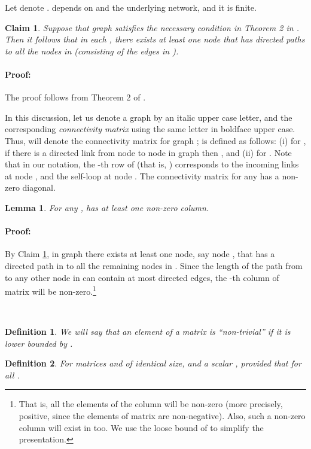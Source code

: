 \documentclass[letterpaper, 12pt]{article}
\newenvironment{proof}{\paragraph{\bf Proof:}}{\hspace*{\fill}}
\newtheorem{claim}{Claim}
\newtheorem{definition}{Definition}
\newtheorem{lemma}{Lemma}
\begin{document}
Let  denote . 
 depends on  and the underlying network, and it is finite.


\begin{claim}
\label{claim_suff}
Suppose that graph  satisfies the necessary condition in 
Theorem 2 in \cite{us}. Then it follows that in each ,
there exists at least one node that has directed paths to all the nodes in 
(consisting of the edges in ).
\end{claim}
\begin{proof}
The proof follows from Theorem 2 of \cite{us}.
\end{proof}

In this discussion, let us denote a graph by an italic upper case letter,
and the corresponding {\em connectivity matrix} using the same letter
in boldface upper case. Thus,
 will denote the connectivity matrix for graph ;
 is defined as follows:
(i) for ,
if there is a directed link from node  to node  in
graph  then ,
and (ii)  for .
Note that in our notation, the -th row of  (that is, )
corresponds to the incoming links at node , and the self-loop
at node .
The connectivity matrix  for any 
has a non-zero diagonal.


\begin{lemma}
\label{l_one_column}
For any ,  has at least one non-zero column.
\end{lemma}
\begin{proof}
By Claim \ref{claim_suff}, in graph  there exists at least one node, say
node , that has a directed path in  to all the remaining nodes in .
Since the length of the path from  to any other node in  can contain
at most  directed edges,
the -th column of matrix  will
be non-zero.\footnote{That is, all the elements of the column will be
non-zero (more precisely, positive, since the elements of matrix 
are non-negative).
Also, such a non-zero column will exist in  too.
We use the loose bound of  to simplify the presentation. }
\end{proof}

~


\begin{definition}
We will say that an element of a matrix is ``non-trivial'' if it is lower
bounded by .
\end{definition}

\begin{definition}
For matrices  and  of identical size, and
a scalar ,  provided
that  for all .
\end{definition}
\end{document}
